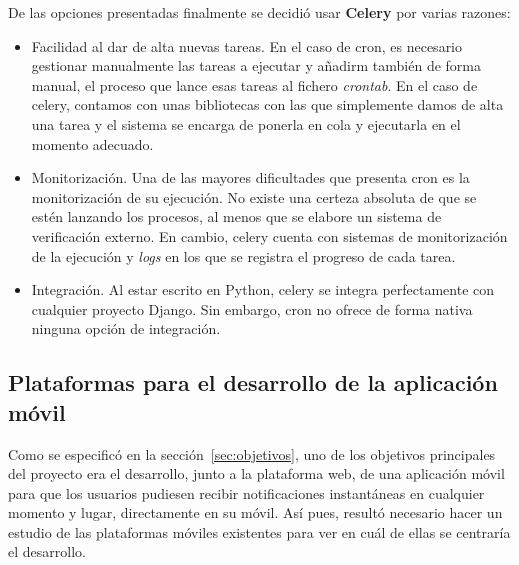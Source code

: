 De las opciones presentadas finalmente se decidió usar \textbf{Celery} por
varias razones:

\begin{itemize}
\item Facilidad al dar de alta nuevas tareas. En el caso de cron, es necesario
  gestionar manualmente las tareas a ejecutar y añadirm también de forma manual,
  el proceso que lance esas tareas al fichero \textit{crontab}. En el caso de
  celery, contamos con unas bibliotecas con las que simplemente damos de alta
  una tarea y el sistema se encarga de ponerla en cola y ejecutarla en el
  momento adecuado.

\item Monitorización. Una de las mayores dificultades que presenta cron es la
  monitorización de su ejecución. No existe una certeza absoluta de que se estén
  lanzando los procesos, al menos que se elabore un sistema de verificación
  externo. En cambio, celery cuenta con sistemas de monitorización de la
  ejecución y \textit{logs} en los que se registra el progreso de cada tarea.

\item Integración. Al estar escrito en Python, celery se integra perfectamente
  con cualquier proyecto Django. Sin embargo, cron no ofrece de forma nativa
  ninguna opción de integración.

\end{itemize}

\subsection{Plataformas para el desarrollo de la aplicación móvil}

Como se especificó en la sección~\ref{sec:objetivos}, uno de los objetivos
principales del proyecto era el desarrollo, junto a la plataforma web, de una
aplicación móvil para que los usuarios pudiesen recibir notificaciones
instantáneas en cualquier momento y lugar, directamente en su móvil. Así pues,
resultó necesario hacer un estudio de las plataformas móviles existentes para
ver en cuál de ellas se centraría el desarrollo.

